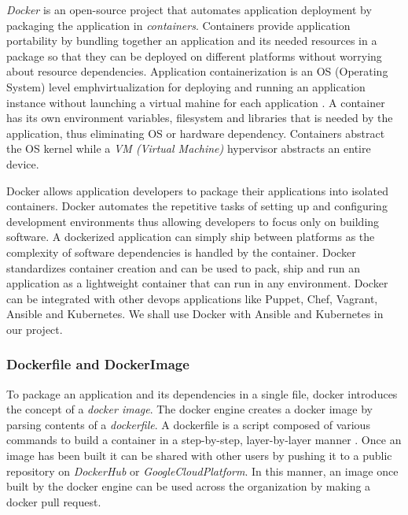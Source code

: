 \documentclass[9pt,twocolumn,twoside]{../../styles/osajnl}
\begin{document}
\emph{Docker} is an open-source project that automates application
deployment by packaging the application in
\emph{containers}. Containers provide application portability by
bundling together an application and its needed resources in a package
so that they can be deployed on different platforms without worrying
about resource dependencies. Application containerization is an OS
(Operating System) level emph{virtualization} for deploying and
running an application instance without launching a virtual mahine for
each application \cite{www-containerization}. A container has its own environment
variables, filesystem and libraries that is needed by the application,
thus eliminating OS or hardware dependency. Containers abstract the OS
kernel while a \emph{VM (Virtual Machine)} hypervisor abstracts an
entire device.

Docker allows application developers to package their applications
into isolated containers. Docker automates the repetitive tasks of
setting up and configuring development environments thus allowing
developers to focus only on building software. A dockerized
application can simply ship between platforms as the complexity of
software dependencies is handled by the container.  Docker
standardizes container creation and can be used to pack, ship and run
an application as a lightweight container that can run in any
environment. Docker can be integrated with other devops applications
like Puppet, Chef, Vagrant, Ansible and Kubernetes. We shall use
Docker with Ansible and Kubernetes in our project.

\subsubsection{Dockerfile and DockerImage}
To package an application and its dependencies in a single file,
docker introduces the concept of a \emph{docker image}. The docker
engine creates a docker image by parsing contents of a
\emph{dockerfile}. A dockerfile is a script composed of various
commands to build a container in a step-by-step, layer-by-layer manner
\cite{www-docker-digitalocean}. Once an image has been built it can be shared with other
users by pushing it to a public repository on \emph{DockerHub} or
\emph{GoogleCloudPlatform}. In this manner, an image once built by the
docker engine can be used across the organization by making a docker
pull request.
\end{document}
